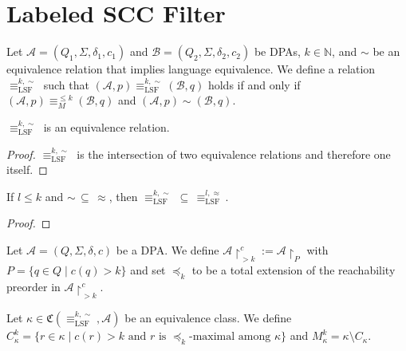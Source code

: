 \section{Labeled SCC Filter}
\label{sect:lsf}

\begin{defn}
	Let $\mathcal{A} = (Q_1, \Sigma, \delta_1, c_1)$ and $\mathcal{B} = (Q_2, \Sigma, \delta_2, c_2)$ be DPAs, $k \in \mathbb{N}$, and $\sim$ be an equivalence relation that implies language equivalence. We define a relation $\equiv_\text{LSF}^{k,\sim}$ such that $(\mathcal{A}, p) \equiv_\text{LSF}^{k,\sim} (\mathcal{B}, q)$ holds if and only if $(\mathcal{A}, p) \equiv_M^{\leq k} (\mathcal{B}, q)$ and $(\mathcal{A}, p) \sim (\mathcal{B}, q)$.
\end{defn}

\begin{lem}
	$\equiv_\text{LSF}^{k,\sim}$ is an equivalence relation.
\end{lem}

\begin{proof}
	$\equiv_\text{LSF}^{k,\sim}$ is the intersection of two equivalence relations and therefore one itself.
\end{proof}

\begin{lem}
	If $l \leq k$ and $\sim \,\subseteq\, \approx$, then $\equiv_\text{LSF}^{k,\sim} \,\subseteq\, \equiv_\text{LSF}^{l,\approx}$.
\end{lem}

\begin{proof}
\end{proof}

\begin{defn}
	Let $\mathcal{A} = (Q, \Sigma, \delta, c)$ be a DPA. We define $\mathcal{A}\upharpoonright^c_{> k} := \mathcal{A}\upharpoonright_P$ with $P = \{q \in Q \mid c(q) > k\}$ and set $\preceq_k$ to be a total extension of the reachability preorder in $\mathcal{A}\upharpoonright^c_{> k}$.
\end{defn}

\begin{defn}
	Let $\kappa \in \mathfrak{C}(\equiv_\text{LSF}^{k,\sim}, \mathcal{A})$ be an equivalence class. We define $C_\kappa^k = \{ r \in \kappa \mid c(r) > k \text{ and } r \text{ is } \preceq_k \text{-maximal among } \kappa \}$ and $M^k_\kappa = \kappa \setminus C_\kappa$.
\end{defn}


\vspace{10pt}

